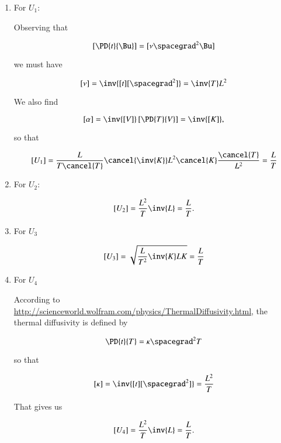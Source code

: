 \begin{enumerate}
\item For $U_1$:

Observing that 

\begin{equation}\label{eqn:continuumProblemSet3:10}
\left[ \PD{t}{\Bu} \right] = [ \nu \spacegrad^2 \Bu ]
\end{equation}

we must have

\begin{equation}\label{eqn:continuumProblemSet3:30}
[\nu] = \inv{[t] [\spacegrad^2]} = \inv{T} L^2
\end{equation}

We also find

\begin{equation}\label{eqn:continuumProblemSet3:50}
[\alpha] = \inv{[V]} \left[ \PD{T}{V} \right] = \inv{[K]},
\end{equation}

so that

\begin{equation}\label{eqn:continuumProblemSet3:70}
[U_1] = \frac{L}{T \cancel{T}} \cancel{\inv{K}} L^2 \cancel{K} \frac{\cancel{T}}{L^2} = \frac{L}{T}
\end{equation}

\item For $U_2$:

\begin{equation}\label{eqn:continuumProblemSet3:90}
[U_2] = \frac{L^2}{T} \inv{L} = \frac{L}{T}.
\end{equation}

\item For $U_3$

\begin{equation}\label{eqn:continuumProblemSet3:110}
[U_3] = \sqrt{ \frac{L}{T^2} \inv{K} L K } = \frac{L}{T}
\end{equation}

\item For $U_4$

According to \href{http://scienceworld.wolfram.com/physics/ThermalDiffusivity.html}{http://scienceworld.wolfram.com/physics/ThermalDiffusivity.html}, the thermal diffusivity is defined by

\begin{equation}\label{eqn:continuumProblemSet3:130}
\PD{t}{T} = \kappa \spacegrad^2 T
\end{equation}

so that 

\begin{equation}\label{eqn:continuumProblemSet3:150}
[\kappa] = \inv{[t][\spacegrad^2]} = \frac{L^2}{T}
\end{equation}

That gives us

\begin{equation}\label{eqn:continuumProblemSet3:170}
[U_4] = \frac{L^2}{T} \inv{L} = \frac{L}{T}.
\end{equation}
\end{enumerate}

